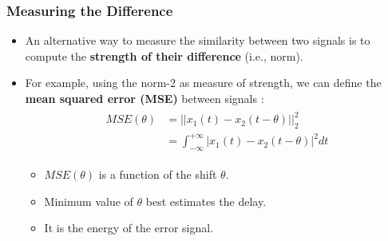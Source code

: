  
\subsubsection{Measuring the Difference}
\begin{itemize}
\item An alternative way to measure the similarity between two signals is to compute the \textbf{strength of their difference} (i.e., norm). 

\item For example, using the norm-2 as measure of strength, we can define the \textbf{mean squared error (MSE)} between signals :
\begin{align*} \begin{split} 
MSE(\theta) &= \lvert \lvert x_{1}(t) - x_{2}(t-\theta) \rvert \rvert_{2}^{2}\\
&=\int_{-\infty}^{+\infty}  \lvert x_{1}(t) - x_{2}(t-\theta) \rvert^{2} dt
\end{split} \end{align*}
\begin{itemize}
\item $MSE(\theta)$ is a function of the shift $\theta$.
\item Minimum value of $\theta$ best estimates the delay. 
\item It is the energy of the error signal.
\end{itemize}
\end{itemize}